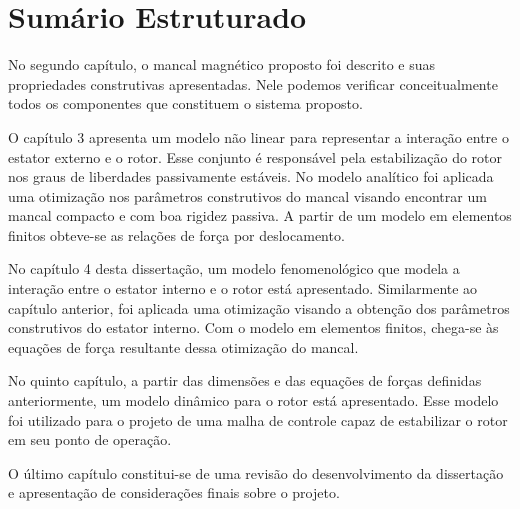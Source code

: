 \section{Sumário Estruturado}
 
No segundo capítulo, o mancal magnético proposto foi descrito e suas propriedades construtivas apresentadas. Nele podemos verificar conceitualmente todos os componentes que constituem o sistema proposto.

O capítulo 3 apresenta um modelo não linear para representar a interação entre o estator externo e o rotor. Esse conjunto é responsável pela estabilização do rotor nos graus de liberdades passivamente estáveis. No modelo analítico foi aplicada uma otimização nos parâmetros construtivos do mancal visando encontrar um mancal compacto e com boa rigidez passiva. A partir de um modelo em elementos finitos obteve-se as relações de força por deslocamento.

No capítulo 4 desta dissertação, um modelo fenomenológico que modela a interação entre o estator interno e o rotor está apresentado. Similarmente ao capítulo anterior, foi aplicada uma otimização visando a obtenção dos parâmetros construtivos do estator interno. Com o modelo em elementos finitos, chega-se às equações de força resultante dessa otimização do mancal.  

No quinto capítulo, a partir das dimensões e das equações de forças definidas anteriormente, um modelo dinâmico para o rotor está apresentado. Esse modelo foi utilizado para o projeto de uma malha de controle capaz de estabilizar o rotor em seu ponto de operação.

O último capítulo constitui-se de uma revisão do desenvolvimento da dissertação e apresentação de considerações finais sobre o projeto.


